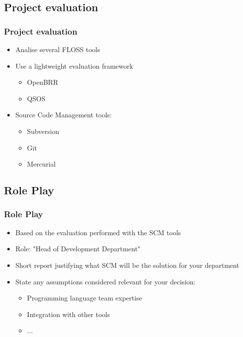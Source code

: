 \documentclass{beamer}
\begin{document}
\subsection{Project evaluation}

\begin{frame}
\frametitle{Project evaluation}

\begin{itemize}
\item Analise several FLOSS tools 
\item Use a lightweight evaluation framework
\begin{itemize}
	\item OpenBRR
	\item QSOS
\end{itemize}

\item Source Code Management tools:
   \begin{itemize}
   \item Subversion
   \item Git
   \item Mercurial
   \end{itemize}

\end{itemize}
\end{frame}



\subsection{Role Play}

\begin{frame}
\frametitle{Role Play}

\begin{itemize}
\item Based on the evaluation performed with the SCM tools
\item Role: "Head of Development Department" 
\item Short report justifying what SCM will be the solution for your department
\item State any assumptions considered relevant for your decision: 
\begin{itemize}
	\item Programming language team expertise 
	\item Integration with other tools
	\item ...
\end{itemize}

\end{itemize}

\end{frame}
\end{document}
